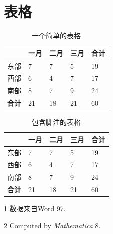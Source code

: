 \documentclass[
    bachelor, 
    ]{xjtuthesis}
\begin{document}
        \section{表格}

            \begin{table}[h!]
              \centering
              \caption{一个简单的表格}
              \label{tab:simple}
              \wuhao
              \begin{tabularx}{\linewidth}{XXXXX} \toprule 
                    & 一月 & 二月 & 三月 & 合计 \\ \midrule
               东部 &    7 &    7 &    5 &   19 \\ 
               西部 &    6 &    4 &    7 &   17 \\ 
               南部 &    8 &    7 &    9 &   24 \\ 
           \bf 合计 &   21 &   18 &   21 &   60 \\ \bottomrule
              \end{tabularx}
            \end{table}


            \begin{table}[h!]
              \begin{threeparttable}[h]
                \centering
                \caption{包含脚注的表格}
                \label{tab:with-footnote}
                \wuhao
                \begin{tabularx}{\linewidth}{XXXXX} \toprule 
                      & 一月 & 二月 & 三月 & 合计 \\ \midrule
                      东部 &    7\tnote{1}
                                    &    7 &    5 &   19 \\ 
                 西部 &    6 &    4 &    7 &   17 \\ 
                 南部 &    8 &    7 &    9 &   24 \\ 
                 \bf 合计\tnote{2}
                      &   21 &   18 &   21 &   60 \\ \bottomrule
                \end{tabularx}
              \begin{tablenotes}
              \item[1] 数据来自Word 97.
              \item[2] Computed by \textsl{Mathematica} 8.
              \end{tablenotes}
              \end{threeparttable}
            \end{table}
\end{document}
